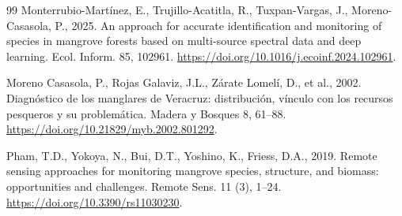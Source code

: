 \documentclass[10pt,twocolumn,a4paper]{article}
\begin{document}
\begin{thebibliography}{99}
Monterrubio-Mart\'inez, E., Trujillo-Acatitla, R., Tuxpan-Vargas, J., Moreno-Casasola, P., 2025. An
approach for accurate identification and monitoring of species in mangrove forests based on
multi-source spectral data and deep learning. Ecol. Inform. 85, 102961.
\url{https://doi.org/10.1016/j.ecoinf.2024.102961}.

Moreno Casasola, P., Rojas Galaviz, J.L., Z\'arate Lomel\'i, D., et al., 2002. Diagn\'ostico de los
manglares de Veracruz: distribuci\'on, v\'inculo con los recursos pesqueros y su problem\'atica.
Madera y Bosques 8, 61--88. \url{https://doi.org/10.21829/myb.2002.801292}.

Pham, T.D., Yokoya, N., Bui, D.T., Yoshino, K., Friess, D.A., 2019. Remote sensing approaches for
monitoring mangrove species, structure, and biomass: opportunities and challenges. Remote Sens.
11 (3), 1--24. \url{https://doi.org/10.3390/rs11030230}.

\end{thebibliography}
\end{document}
